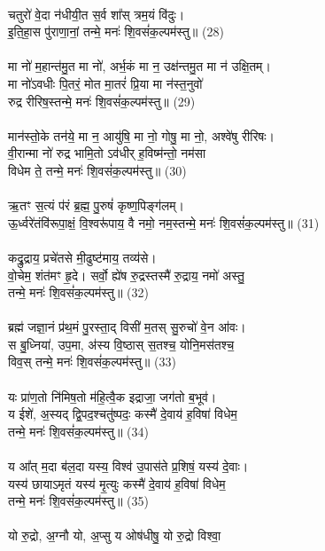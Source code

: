 \\
चतुरो॑ वे॒दा न॑धीयी॒त स॒र्व शा᳚स् त्रम॒यं वि॑दुः।  \\
इ॒ति॒हा॒स पु॑राणा॒नां॒ तन्मे॒ मनः॑ शि॒वसं॑क॒ल्पम॑स्तु॥ (28)\\
\\
मा नो॑ म॒हान्त॑मु॒त मा नो॑, अर्भ॒कं मा न॒ उक्ष॑न्तमु॒त मा न॑ उक्षि॒तम्। \\
मा नो॑ऽवधीः पि॒तरं॒ मोत मा॒तरं॑ प्रि॒या मा न॑स्त॒नुवो॑ \\
रुद्र रीरिष॒स्तन्मे॒ मनः॑ शि॒वसं॑क॒ल्पम॑स्तु॥  (29)\\
\\
मान॑स्तो॒के तन॑ये॒ मा न॒ आयु॑षि॒ मा नो॒ गोषु॒ मा नो॒, अश्वे॑षु रीरिषः। \\
वी॒रान्मा नो॑ रुद्र भामि॒तो ऽव॑धीर् ह॒विष्म॑न्तो॒ नम॑सा \\
विधेम ते॒ तन्मे॒ मनः॑ शि॒वसं॑क॒ल्पम॑स्तु॥ (30)\\
\\
ऋ॒तꣳ स॒त्यं प॑रं ब्र॒ह्म॒ पु॒रुषं॑ कृष्ण॒पिङ्ग॑लम्। \\
ऊ॒र्ध्वरे॑तंवि॑रूपा॒क्षं॒ वि॒श्वरू॑पाय॒ वै नमो॒ नम॒स्तन्मे॒ मनः॑ शि॒वसं॑क॒ल्पम॑स्तु॥ (31)\\
\\
कद्रु॒द्राय॒ प्रचे॑तसे मी॒ढुष्ट॑माय॒ तव्य॑से। \\
वो॒चेम॒ शंत॑मꣳ हृ॒दे। सर्वो॒ ह्ये॑ष रु॒द्रस्तस्मै॑ रु॒द्राय॒ नमो॑ अस्तु॒ \\
तन्मे॒ मनः॑ शि॒वसं॑क॒ल्पम॑स्तु॥ (32)\\
\\
ब्रह्म॑ जज्ञा॒नं प्र॑थ॒मं पु॒रस्ता॒द् विसी॑ म॒तस् सु॒रुचो॑ वे॒न आ॑वः। \\
स बु॒ध्निया॑, उप॒मा, अ॑स्य वि॒ष्ठास् स॒तश्च॒ योनि॒मस॑तश्च॒ \\
विव॒स् तन्मे॒ मनः॑ शि॒वसं॑क॒ल्पम॑स्तु॥ (33)\\
\\
यः प्रा॑ण॒तो नि॑मिष॒तो म॑हि॒त्वै॒क इद्राजा॒ जग॑तो ब॒भूव॑।\\
य ईशे॑, अ॒स्यद् द्वि॒पद॒श्चतु॑ष्पदः॒ कस्मै॑ दे॒वाय॑ ह॒विषा॑ विधेम॒ \\
तन्मे॒ मनः॑ शि॒वसं॑क॒ल्पम॑स्तु॥ (34)\\
\\
य आ᳚त् म॒दा ब॑ल॒दा यस्य॒ विश्व॑ उ॒पास॑ते प्र॒शिषं॒ यस्य॑ दे॒वाः। \\
यस्य॑ छायाऽमृतं यस्य॑ मृ॒त्युः कस्मै॑ दे॒वाय॑ ह॒विषा॑ विधेम॒ \\
तन्मे॒ मनः॑ शि॒वसं॑क॒ल्पम॑स्तु॥ (35)\\
\\
यो रु॒द्रो, अ॒ग्नौ यो, अ॒प्सु य ओष॑धीषु॒ यो रु॒द्रो विश्वा॒ \\
